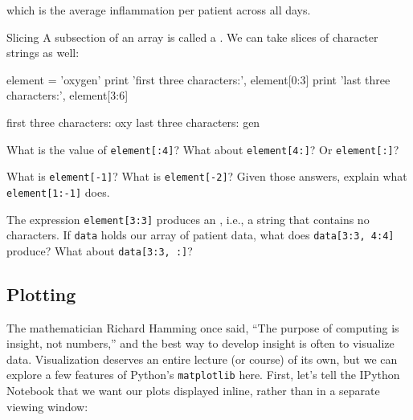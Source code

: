 \documentclass{book}
\begin{document}
which is the average inflammation per patient across all days.

\begin{swcbox}{Slicing}
A subsection of an array is called a . We can
take slices of character strings as well:

\begin{VerbIn}
element = 'oxygen'
print 'first three characters:', element[0:3]
print 'last three characters:', element[3:6]
\end{VerbIn}

\begin{VerbOut}
first three characters: oxy
last three characters: gen
\end{VerbOut}
\end{swcbox}

\begin{challenge}
  What is the value of \texttt{element{[}:4{]}}? What about
  \texttt{element{[}4:{]}}? Or \texttt{element{[}:{]}}?
\end{challenge}

\begin{challenge}
  What is \texttt{element{[}-1{]}}? What is \texttt{element{[}-2{]}}?
  Given those answers, explain what \texttt{element{[}1:-1{]}} does.
\end{challenge}

\begin{challenge}
  The expression \texttt{element{[}3:3{]}} produces an
  , i.e., a string that contains
  no characters. If \texttt{data} holds our array of patient data, what
  does \texttt{data{[}3:3, 4:4{]}} produce? What about
  \texttt{data{[}3:3, :{]}}?
\end{challenge}

\subsection{Plotting}

The mathematician Richard Hamming once said, ``The purpose of computing
is insight, not numbers,'' and the best way to develop insight is often
to visualize data. Visualization deserves an entire lecture (or course)
of its own, but we can explore a few features of Python's
\texttt{matplotlib} here. First, let's tell the IPython Notebook that we
want our plots displayed inline, rather than in a separate viewing
window:

\begin{VerbIn}
\end{VerbIn}
\end{document}

